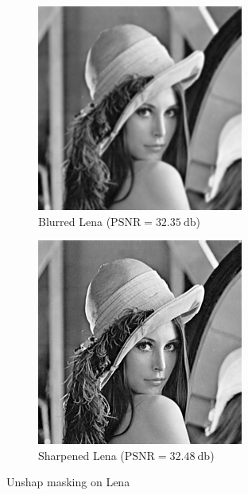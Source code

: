 \documentclass[12pt,english]{article}
\begin{document}
\begin{figure}
	\centering
	\begin{subfigure}[t]{0.4\textwidth}
		\centering
		\includegraphics[width=.9\textwidth]{img/blurred}
		\caption{Blurred Lena ($\text{PSNR}=\SI{32.35}{\decibel}$)}
		\label{fig:blur}
	\end{subfigure}%
	\qquad%
	\begin{subfigure}[t]{0.4\textwidth}
		\centering
		\includegraphics[width=.9\textwidth]{img/sharped}
		\caption{Sharpened Lena ($\text{PSNR}=\SI{32.48}{\decibel}$)}
		\label{fig:shap}
	\end{subfigure}
	\caption{Unshap masking on Lena}
	\label{fig:lenaum}
\end{figure}
\end{document}
